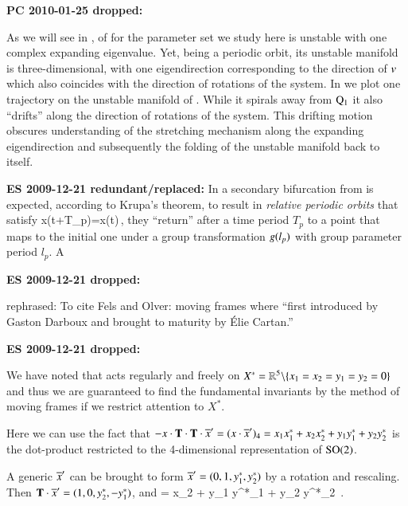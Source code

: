 {\bf PC 2010-01-25 dropped:}


As we will see in ,  of {\cLe}
for the parameter set we study here is unstable with one
complex expanding eigenvalue. Yet, being a periodic orbit,
its unstable manifold is three-dimensional, with one
eigendirection corresponding to the direction of $v$ which
also coincides with the direction of rotations of the system.
In  we plot one trajectory on the unstable
manifold of . While it spirals away from
$\mathrm{Q}_{1}$ it also ``drifts'' along the direction of
rotations of the system. This drifting motion obscures
understanding of the stretching mechanism along the expanding
eigendirection and subsequently the folding of the unstable
manifold back to itself.


{\bf ES 2009-12-21 redundant/replaced:}
In {\cLe} a secondary
bifurcation from  is expected, according to Krupa's
theorem, to result in \emph{relative periodic
orbits} that satisfy
\beq
	x(t+T_p)=x(t)\,,
\eeq
{\ie} they ``return'' after a time period $T_p$ to a point
that maps to the initial one under a group transformation
$g(l_p)$ with group parameter period $l_p$. A {\rpo}

{\bf ES 2009-12-21 dropped:}

rephrased: To cite Fels and Olver:
moving frames where ``first introduced by Gaston Darboux
and brought to maturity by \'Elie Cartan.''


{\bf ES 2009-12-21 dropped:}

We have noted that  acts regularly and freely on
$X^*=\mathbb{R}^{5}\backslash\{x_1=x_2=y_1=y_2=0\}$ and thus we are
guaranteed to find the fundamental invariants by the method
of moving frames if we restrict attention to $X^*$.


Here we can use the fact that
$- x \cdot \mathbf{T}\cdot\mathbf{T} \cdot {\ensuremath{\overline{x}'}}
 = (x \cdot {\ensuremath{\overline{x}'}} )_4 =
    x_1 x_1^{*}
   +x_2 x_2^{*}
   +y_1 y_1^{*}
   +y_2 y_2^{*}
$
is the dot-product restricted to the 4-dimensional
representation of $\textrm{SO}(2)$.

A generic  $ {\overline{x}'} $ can be brought to form $ {\overline{x}'}  =
(0,1,y_1^{*},y_2^{*})$ by a rotation and rescaling. Then $\mathbf{T}
\cdot {\ensuremath{\overline{x}'}}   = (1,0,y_2^{*},-y_1^{*})$, and
\beq
{} =
     {x_2 + y_1 y^{*}_1 + y_2 y^{*}_2}
\,.
\label{PCsectSin}
\eeq


